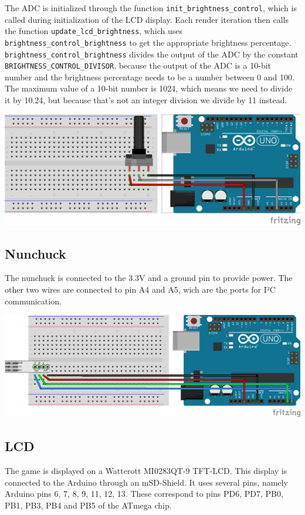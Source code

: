 The ADC is initialized through the function \texttt{init\_brightness\_control},
which is called during initialization of the LCD display. Each render iteration
then calls the function \texttt{update\_lcd\_brightness}, which uses
\texttt{brightness\_control\_brightness} to get the appropriate brightness
percentage. \texttt{brightness\_control\_brightness} divides the output of the
ADC by the constant \texttt{BRIGHTNESS\_CONTROL\_DIVISOR}, because the output
of the ADC is a 10-bit number and the brightness percentage needs to be a
number between 0 and 100. The maximum value of a 10-bit number is 1024, which
means we need to divide it by 10.24, but because that's not an integer division
we divide by 11 instead.

\includegraphics[width=\textwidth,height=\textheight,keepaspectratio]{res/potentiometer.png}

\subsection{Nunchuck}
\label{sec:nunchuck}

The nunchuck is connected to the 3.3V and a ground pin to provide power. The
other two wires are connected to pin A4 and A5, wich are the ports for I²C
communication.

\includegraphics[width=\textwidth,height=\textheight,keepaspectratio]{res/nunchuck.png}

\subsection{LCD}
\label{sec:lcd}

The game is displayed on a Watterott MI0283QT-9 TFT-LCD\cite{mi0283qt9}\@. This
display is connected to the Arduino through an mSD-Shield\cite{msd-shield}. It
uses several pins, namely Arduino pins 6, 7, 8, 9, 11, 12, 13. These correspond
to pins PD6, PD7, PB0, PB1, PB3, PB4 and PB5 of the ATmega chip.
